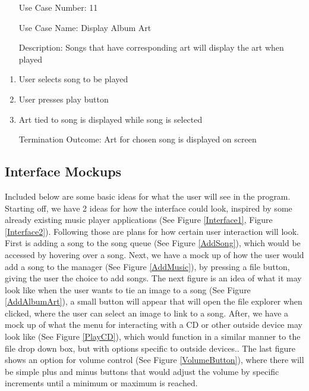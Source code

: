 \documentclass[10pt,conference,onecolumn,compsoc]{IEEEtran}
\begin{document}
\begin{itemize}
\item[Use Case Number:] 11
\item[Use Case Name:] Display Album Art
\item[Description:] Songs that have corresponding art will display the art when played
\end{itemize}

\begin{enumerate}
\item User selects song to be played
\item User presses play button
\item Art tied to song is displayed while song is selected
\item[Termination Outcome:] Art for chosen song is displayed on screen 
\end{enumerate}

\subsection{Interface Mockups}
Included below are some basic ideas for what the user will see in the program. Starting off, we have 2 ideas for how the interface could look, inspired by some already existing music player applications (See Figure \ref{Interface1}, Figure \ref{Interface2}). Following those are plans for how certain user interaction will look. First is adding a song to the song queue (See Figure \ref{AddSong}), which would be accessed by hovering over a song. Next, we have a mock up of how the user would add a song to the manager (See Figure \ref{AddMusic}), by pressing a file button, giving the user the choice to add songs. The next figure is an idea of what it may look like when the user wants to tie an image to a song (See Figure \ref{AddAlbumArt}), a small button will appear that will open the file explorer when clicked, where the user can select an image to link to a song. After, we have a mock up of what the menu for interacting with a CD or other outside device may look like (See Figure \ref{PlayCD}), which would function in a similar manner to the file drop down box, but with options specific to outside devices.. The last figure shows an option for volume control (See Figure \ref{VolumeButton}), where there will be simple plus and minus buttons that would adjust the volume by specific increments until a minimum or maximum is reached.
\end{document}
